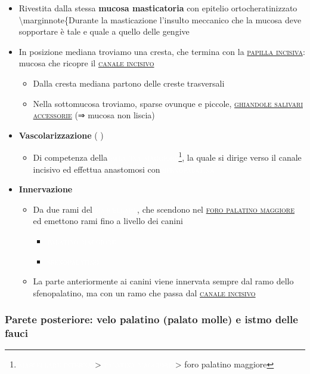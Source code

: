 \documentclass[italian,]{article}
\providecommand{\tightlist}{%
  \setlength{\itemsep}{0pt}\setlength{\parskip}{0pt}}
\newcommand{\art}[1]{\colorbox{RedOrange}{\textcolor{white}{\textsc{#1}}}}
\newcommand{\ner}[1]{\colorbox{Dandelion}{\textcolor{white}{\textsc{#1}}}}
\renewcommand{\a}[1]{\underline{\textsc{#1}}}
\newcommand{\netter}[1]{ \fbox{\textsf{Netter (2014), tav. #1}} }
\begin{document}
\begin{itemize}
\tightlist
\item
  Rivestita dalla stessa \textbf{mucosa masticatoria} con epitelio
  ortocheratinizzato \textbackslash{}marginnote\{Durante la masticazione
  l'insulto meccanico che la mucosa deve sopportare è tale e quale a
  quello delle gengive
\item
  In posizione mediana troviamo una cresta, che termina con la
  \a{papilla incisiva}: mucosa che ricopre il \a{canale incisivo}

  \begin{itemize}
  \tightlist
  \item
    Dalla cresta mediana partono delle creste trasversali
  \item
    Nella sottomucosa troviamo, sparse ovunque e piccole,
    \a{ghiandole salivari accessorie} (⇒ mucosa non liscia)
  \end{itemize}
\item
  \textbf{Vascolarizzazione} (\netter{57})

  \begin{itemize}
  \tightlist
  \item
    Di competenza della \art{palatina maggiore}\footnote{\art{mascellare interna}
      \textgreater{} \art{palatina maggiore} \textgreater{} foro
      palatino maggiore}, la quale si dirige verso il canale incisivo ed
    effettua anastomosi con \art{sfenopalatina}
  \end{itemize}
\item
  \textbf{Innervazione}

  \begin{itemize}
  \tightlist
  \item
    Da due rami del \ner{mascellare}, che scendono nel
    \a{foro palatino maggiore} ed emettono rami fino a livello dei
    canini

    \begin{itemize}
    \item
      \ner{palatino maggiore}
    \item
      \ner{sfenopalatino}
    \end{itemize}
  \item
    La parte anteriormente ai canini viene innervata sempre dal ramo
    dello sfenopalatino, ma con un ramo che passa dal
    \a{canale incisivo}
  \end{itemize}
\end{itemize}

\hypertarget{parete-posteriore-velo-palatino-palato-molle-e-istmo-delle-fauci}{%
\subsubsection{Parete posteriore: velo palatino (palato molle) e istmo
delle
fauci}\label{parete-posteriore-velo-palatino-palato-molle-e-istmo-delle-fauci}}
\end{document}
